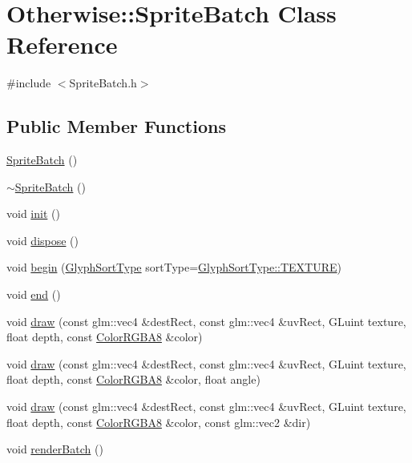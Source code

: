 \hypertarget{class_otherwise_1_1_sprite_batch}{}\section{Otherwise\+:\+:Sprite\+Batch Class Reference}
\label{class_otherwise_1_1_sprite_batch}


{\ttfamily \#include $<$Sprite\+Batch.\+h$>$}

\subsection*{Public Member Functions}
\begin{DoxyCompactItemize}
\item 
\hyperlink{class_otherwise_1_1_sprite_batch_a1d8cdf1c0316c66baf4c67dbb125e77f}{Sprite\+Batch} ()
\item 
\hyperlink{class_otherwise_1_1_sprite_batch_a5d9bc87c84c9c08fd9ebff10c41b1842}{$\sim$\+Sprite\+Batch} ()
\item 
void \hyperlink{class_otherwise_1_1_sprite_batch_adeef815083edeaaec84849b217c89953}{init} ()
\item 
void \hyperlink{class_otherwise_1_1_sprite_batch_aa4a75875485b398fdf8410224824afdb}{dispose} ()
\item 
void \hyperlink{class_otherwise_1_1_sprite_batch_aff42633c9a65604638e6589130672b54}{begin} (\hyperlink{namespace_otherwise_aa27b94bf7fe0e95dd17ed0a3506b12ee}{Glyph\+Sort\+Type} sort\+Type=\hyperlink{namespace_otherwise_aa27b94bf7fe0e95dd17ed0a3506b12eea3f92f542bd9ec48f912b9350e22736ac}{Glyph\+Sort\+Type\+::\+T\+E\+X\+T\+U\+RE})
\item 
void \hyperlink{class_otherwise_1_1_sprite_batch_ae4ba15d640dc3f711656bf034065b9c5}{end} ()
\item 
void \hyperlink{class_otherwise_1_1_sprite_batch_a184beec530e945fddba1684a6ec60b50}{draw} (const glm\+::vec4 \&dest\+Rect, const glm\+::vec4 \&uv\+Rect, G\+Luint texture, float depth, const \hyperlink{struct_otherwise_1_1_color_r_g_b_a8}{Color\+R\+G\+B\+A8} \&color)
\item 
void \hyperlink{class_otherwise_1_1_sprite_batch_a87d88f02c722962bf001029bfbcc5865}{draw} (const glm\+::vec4 \&dest\+Rect, const glm\+::vec4 \&uv\+Rect, G\+Luint texture, float depth, const \hyperlink{struct_otherwise_1_1_color_r_g_b_a8}{Color\+R\+G\+B\+A8} \&color, float angle)
\item 
void \hyperlink{class_otherwise_1_1_sprite_batch_ad64d1d168e2da81e72852685aba464f8}{draw} (const glm\+::vec4 \&dest\+Rect, const glm\+::vec4 \&uv\+Rect, G\+Luint texture, float depth, const \hyperlink{struct_otherwise_1_1_color_r_g_b_a8}{Color\+R\+G\+B\+A8} \&color, const glm\+::vec2 \&dir)
\item 
void \hyperlink{class_otherwise_1_1_sprite_batch_abad7824a3b0bcf28e41f094b62aa076f}{render\+Batch} ()
\end{DoxyCompactItemize}
